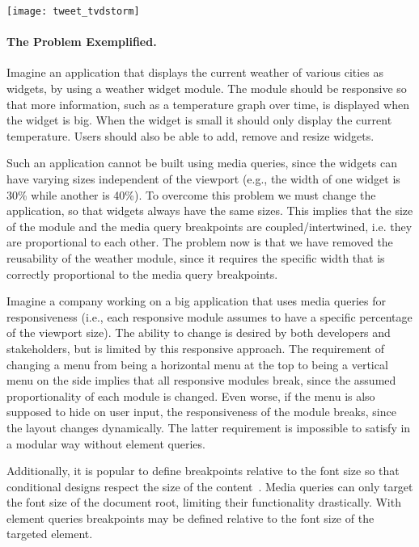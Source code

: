 \documentclass[sigconf,9pt]{acmart}
\begin{document}
  \texttt{[image: tweet\_tvdstorm]}

  \paragraph{The Problem Exemplified.}
    Imagine an application that displays the current weather of various cities as widgets, by using a weather widget module.
    The module should be responsive so that more information, such as a temperature graph over time, is displayed when the widget is big.
    When the widget is small it should only display the current temperature.
    Users should also be able to add, remove and resize widgets.

    Such an application cannot be built using media queries, since the widgets can have varying sizes independent of the viewport (e.g., the width of one widget is 30\% while another is 40\%).
    To overcome this problem we must change the application, so that widgets always have the same sizes.
    This implies that the size of the module and the media query breakpoints are coupled/intertwined, i.e. they are proportional to each other.
    The problem now is that we have removed the reusability of the weather module, since it requires the specific width that is correctly proportional to the media query breakpoints.

    Imagine a company working on a big application that uses media queries for responsiveness (i.e., each responsive module assumes to have a specific percentage of the viewport size).
    The ability to change is desired by both developers and stakeholders, but is limited by this responsive approach.
    The requirement of changing a menu from being a horizontal menu at the top to being a vertical menu on the side implies that all responsive modules break, since the assumed proportionality of each module is changed.
    Even worse, if the menu is also supposed to hide on user input, the responsiveness of the module breaks, since the layout changes dynamically.
    The latter requirement is impossible to satisfy in a modular way without element queries.

    Additionally, it is popular to define breakpoints relative to the font size so that conditional designs respect the size of the content~\cite{mq-em}.
    Media queries can only target the font size of the document root, limiting their functionality drastically.
    With element queries breakpoints may be defined relative to the font size of the targeted element.
\end{document}
